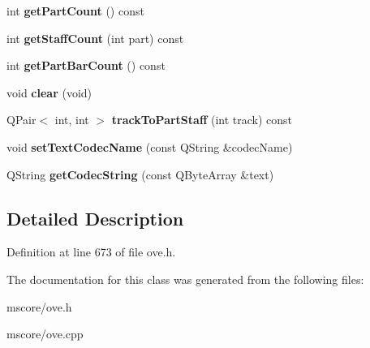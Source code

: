 \begin{DoxyCompactItemize}
\mbox{\label{class_o_v_e_1_1_ove_song_adb7e082b62cbc711a8b5738589096007}} 
int {\bfseries get\+Part\+Count} () const
\item 
\mbox{\label{class_o_v_e_1_1_ove_song_a904c1d35ff6517b11db17f97b72884e9}} 
int {\bfseries get\+Staff\+Count} (int part) const
\item 
\mbox{\label{class_o_v_e_1_1_ove_song_a68c1992f9437d50f91879917d54e7a63}} 
int {\bfseries get\+Part\+Bar\+Count} () const
\item 
\mbox{\label{class_o_v_e_1_1_ove_song_ad99f690d6530fcdc58e206b3aa3221aa}} 
void {\bfseries clear} (void)
\item 
\mbox{\label{class_o_v_e_1_1_ove_song_a5d7b5b8b5590932ccec96e536e4dcf67}} 
Q\+Pair$<$ int, int $>$ {\bfseries track\+To\+Part\+Staff} (int track) const
\item 
\mbox{\label{class_o_v_e_1_1_ove_song_a941f5de9fe8e586d07f7841c691b85aa}} 
void {\bfseries set\+Text\+Codec\+Name} (const Q\+String \&codec\+Name)
\item 
\mbox{\label{class_o_v_e_1_1_ove_song_a51823f16054ec3e47394263bd736a0c1}} 
Q\+String {\bfseries get\+Codec\+String} (const Q\+Byte\+Array \&text)
\end{DoxyCompactItemize}


\subsection{Detailed Description}


Definition at line 673 of file ove.\+h.



The documentation for this class was generated from the following files\+:\begin{DoxyCompactItemize}
\item 
mscore/ove.\+h\item 
mscore/ove.\+cpp\end{DoxyCompactItemize}
